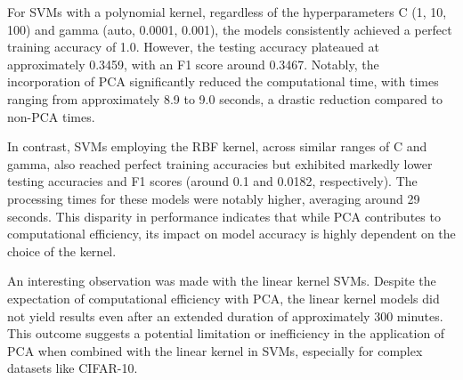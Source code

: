 \documentclass[conference]{IEEEtran}
\begin{document}
For SVMs with a polynomial kernel, regardless of the hyperparameters C (1, 10, 100) and gamma (auto, 0.0001, 0.001), the models consistently achieved a perfect training accuracy of 1.0. However, the testing accuracy plateaued at approximately 0.3459, with an F1 score around 0.3467. Notably, the incorporation of PCA significantly reduced the computational time, with times ranging from approximately 8.9 to 9.0 seconds, a drastic reduction compared to non-PCA times.

In contrast, SVMs employing the RBF kernel, across similar ranges of C and gamma, also reached perfect training accuracies but exhibited markedly lower testing accuracies and F1 scores (around 0.1 and 0.0182, respectively). The processing times for these models were notably higher, averaging around 29 seconds. This disparity in performance indicates that while PCA contributes to computational efficiency, its impact on model accuracy is highly dependent on the choice of the kernel.

An interesting observation was made with the linear kernel SVMs. Despite the expectation of computational efficiency with PCA, the linear kernel models did not yield results even after an extended duration of approximately 300 minutes. This outcome suggests a potential limitation or inefficiency in the application of PCA when combined with the linear kernel in SVMs, especially for complex datasets like CIFAR-10.
\end{document}
